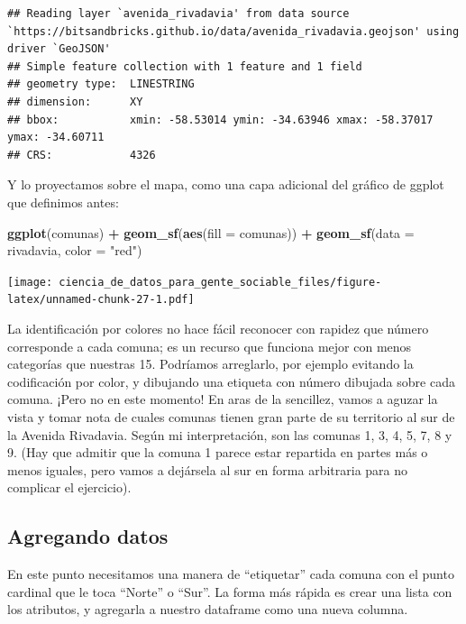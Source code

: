 \documentclass[spanish,]{book}
\newenvironment{Shaded}{\begin{snugshade}}{\end{snugshade}}
\newcommand{\DataTypeTok}[1]{\textcolor[rgb]{0.13,0.29,0.53}{#1}}
\newcommand{\KeywordTok}[1]{\textcolor[rgb]{0.13,0.29,0.53}{\textbf{#1}}}
\newcommand{\NormalTok}[1]{#1}
\newcommand{\OperatorTok}[1]{\textcolor[rgb]{0.81,0.36,0.00}{\textbf{#1}}}
\newcommand{\StringTok}[1]{\textcolor[rgb]{0.31,0.60,0.02}{#1}}
\begin{document}
\begin{verbatim}
## Reading layer `avenida_rivadavia' from data source `https://bitsandbricks.github.io/data/avenida_rivadavia.geojson' using driver `GeoJSON'
## Simple feature collection with 1 feature and 1 field
## geometry type:  LINESTRING
## dimension:      XY
## bbox:           xmin: -58.53014 ymin: -34.63946 xmax: -58.37017 ymax: -34.60711
## CRS:            4326
\end{verbatim}

Y lo proyectamos sobre el mapa, como una capa adicional del gráfico de ggplot que definimos antes:

\begin{Shaded}
\begin{Highlighting}[]
\KeywordTok{ggplot}\NormalTok{(comunas) }\OperatorTok{+}
\StringTok{    }\KeywordTok{geom_sf}\NormalTok{(}\KeywordTok{aes}\NormalTok{(}\DataTypeTok{fill =}\NormalTok{ comunas)) }\OperatorTok{+}
\StringTok{    }\KeywordTok{geom_sf}\NormalTok{(}\DataTypeTok{data =}\NormalTok{ rivadavia, }\DataTypeTok{color =} \StringTok{"red"}\NormalTok{)}
\end{Highlighting}
\end{Shaded}

\texttt{[image: ciencia\_de\_datos\_para\_gente\_sociable\_files/figure-latex/unnamed-chunk-27-1.pdf]}

La identificación por colores no hace fácil reconocer con rapidez que número corresponde a cada comuna; es un recurso que funciona mejor con menos categorías que nuestras 15. Podríamos arreglarlo, por ejemplo evitando la codificación por color, y dibujando una etiqueta con número dibujada sobre cada comuna. ¡Pero no en este momento! En aras de la sencillez, vamos a aguzar la vista y tomar nota de cuales comunas tienen gran parte de su territorio al sur de la Avenida Rivadavia. Según mi interpretación, son las comunas 1, 3, 4, 5, 7, 8 y 9. (Hay que admitir que la comuna 1 parece estar repartida en partes más o menos iguales, pero vamos a dejársela al sur en forma arbitraria para no complicar el ejercicio).

\hypertarget{agregando-datos}{%
\subsection{Agregando datos}\label{agregando-datos}}

En este punto necesitamos una manera de ``etiquetar'' cada comuna con el punto cardinal que le toca ``Norte'' o ``Sur''. La forma más rápida es crear una lista con los atributos, y agregarla a nuestro dataframe como una nueva columna.
\end{document}
